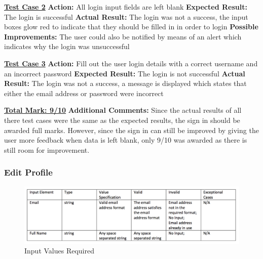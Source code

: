 \documentclass[english]{article}
\begin{document}
\textbf{\underline{Test Case 2}}\newline
\textbf{Action:} All login input fields are left blank\newline
\textbf{Expected Result:} The login is successful\newline
\textbf{Actual Result:} The login was not a success, the input boxes glow red to indicate that they should be filled in in order to login\newline
\textbf{Possible Improvements:} The user could also be notified by means of an alert which indicates why the login was unsuccessful\newline

\textbf{\underline{Test Case 3}}\newline
\textbf{Action:} Fill out the user login details with a correct username and an incorrect password\newline
\textbf{Expected Result:} The login is not successful\newline
\textbf{Actual Result:} The login was not a success, a message is displayed which states that either the email address or password were incorrect\newline

\textbf{\underline{Total Mark: 9/10}}\newline
\textbf{Additional Comments:} Since the actual results of all there test cases were the same as the expected results, the sign in should be awarded full marks. However, since the sign in can still be improved by giving the user more feedback when data is left blank, only 9/10 was awarded as there is still room for improvement.\newline

\subsubsection{Edit Profile}

\begin{figure}[H]
\centering
\includegraphics[width=1.0\textwidth]{editprofile_input_values_required}
\caption{Input Values Required}
\end{figure}
\end{document}

